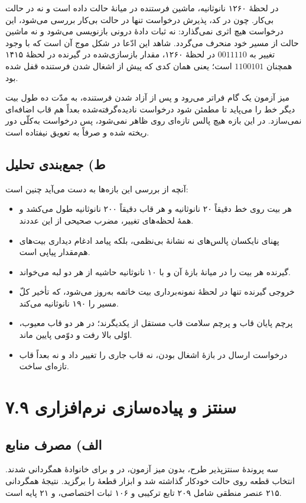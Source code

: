 \documentclass[12pt,a4paper]{article}
\begin{document}
	در لحظهٔ ۱۲۶۰ نانوثانیه، ماشین فرستنده در میانهٔ حالت داده است و نه در حالت بی‌کار. چون در کد، پذیرش درخواست تنها در حالت بی‌کار بررسی می‌شود، این درخواست هیچ اثری نمی‌گذارد: نه ثبات دادهٔ درونی بازنویسی می‌شود و نه ماشین حالت از مسیر خود منحرف می‌گردد. شاهد این ادّعا در شکل موج آن است که با وجود تغییر  به \(0011110\) در لحظهٔ ۱۲۶۰، مقدار بازسازی‌شده در گیرنده در لحظهٔ ۱۴۱۵ همچنان \(1100101\) است؛ یعنی همان کدی که پیش از اشغال شدن فرستنده قفل شده بود.

	میز آزمون یک گام فراتر می‌رود و پس از آزاد شدن فرستنده، به مدّت ده طول بیت دیگر خط را می‌پاید تا مطمئن شود درخواست نادیده‌گرفته‌شده بعداً هم قاب اضافه‌ای نمی‌سازد. در این بازه هیچ پالس تازه‌ای روی  ظاهر نمی‌شود، پس درخواست به‌کلّی دور ریخته شده و صرفاً به تعویق نیفتاده است.

	\subsection*{ط) جمع‌بندی تحلیل}
	آنچه از بررسی این بازه‌ها به دست می‌آید چنین است:
	\begin{itemize}
		\item هر بیت روی خط دقیقاً ۲۰ نانوثانیه و هر قاب دقیقاً ۲۰۰ نانوثانیه طول می‌کشد و همهٔ لحظه‌های تغییر، مضرب صحیحی از این عددند.
		\item پهنای نایکسان پالس‌های  نه نشانهٔ بی‌نظمی، بلکه پیامد ادغام دیداری بیت‌های هم‌مقدار پیاپی است.
		\item گیرنده هر بیت را در میانهٔ بازهٔ آن و با ۱۰ نانوثانیه حاشیه از هر دو لبه می‌خواند.
		\item خروجی گیرنده تنها در لحظهٔ نمونه‌برداری بیت خاتمه به‌روز می‌شود، که تأخیر کلّ مسیر را ۱۹۰ نانوثانیه می‌کند.
		\item پرچم پایان قاب و پرچم سلامت قاب مستقل از یکدیگرند؛ در هر دو قاب معیوب، اوّلی بالا رفت و دوّمی پایین ماند.
		\item درخواست ارسال در بازهٔ اشغال بودن، نه قاب جاری را تغییر داد و نه بعداً قاب تازه‌ای ساخت.
	\end{itemize}

	\section*{۷.۹ سنتز و پیاده‌سازی نرم‌افزاری}
	\subsection*{الف) مصرف منابع}
	سه پروندهٔ سنتز‌پذیر طرح، بدون میز آزمون، در  و برای خانوادهٔ  همگردانی شدند. انتخاب قطعه روی حالت خودکار گذاشته شد و ابزار قطعهٔ  را برگزید. نتیجهٔ همگردانی ۲۱۵ عنصر منطقی شامل ۲۰۹ تابع ترکیبی و ۱۰۶ ثبات اختصاصی، و ۲۱ پایه است.
\end{document}
